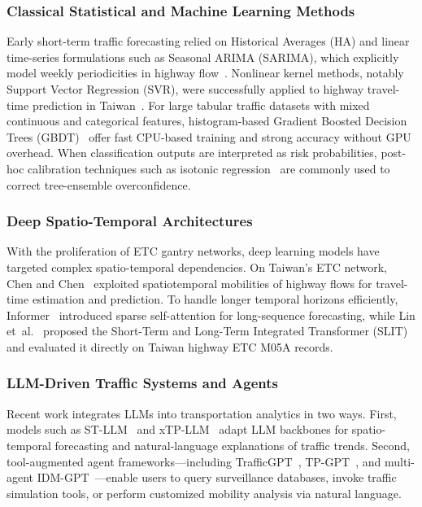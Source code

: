 \documentclass[conference]{IEEEtran}
\begin{document}
\subsubsection{Classical Statistical and Machine Learning Methods}
Early short-term traffic forecasting relied on Historical Averages (HA) and linear time-series formulations such as Seasonal ARIMA (SARIMA), which explicitly model weekly periodicities in highway flow~\cite{williams2003sarima}. Nonlinear kernel methods, notably Support Vector Regression (SVR), were successfully applied to highway travel-time prediction in Taiwan~\cite{wu2004svr}. For large tabular traffic datasets with mixed continuous and categorical features, histogram-based Gradient Boosted Decision Trees (GBDT)~\cite{ke2017lightgbm,pedregosa2011sklearn} offer fast CPU-based training and strong accuracy without GPU overhead. When classification outputs are interpreted as risk probabilities, post-hoc calibration techniques such as isotonic regression~\cite{zadrozny2002isotonic} are commonly used to correct tree-ensemble overconfidence.

\subsubsection{Deep Spatio-Temporal Architectures}
With the proliferation of ETC gantry networks, deep learning models have targeted complex spatio-temporal dependencies. On Taiwan's ETC network, Chen and Chen~\cite{chen2021etc} exploited spatiotemporal mobilities of highway flows for travel-time estimation and prediction. To handle longer temporal horizons efficiently, Informer~\cite{zhou2021informer} introduced sparse self-attention for long-sequence forecasting, while Lin et~al.~\cite{lin2024slit} proposed the Short-Term and Long-Term Integrated Transformer (SLIT) and evaluated it directly on Taiwan highway ETC M05A records.

\subsubsection{LLM-Driven Traffic Systems and Agents}
Recent work integrates LLMs into transportation analytics in two ways. First, models such as ST-LLM~\cite{liu2024stllm} and xTP-LLM~\cite{guo2024xtpllm} adapt LLM backbones for spatio-temporal forecasting and natural-language explanations of traffic trends. Second, tool-augmented agent frameworks---including TrafficGPT~\cite{zhang2023trafficgpt}, TP-GPT~\cite{wang2024tpgpt}, and multi-agent IDM-GPT~\cite{yang2025idmgpt}---enable users to query surveillance databases, invoke traffic simulation tools, or perform customized mobility analysis via natural language.
\end{document}
